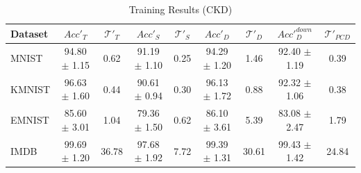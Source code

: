 \begin{table}
\caption{Training Results (CKD)}
\label{tab:train-table-ckd}
\begin{tabular}{lcccccccc}
\toprule
Dataset & $Acc'_T$ & $\mathcal{T}'_T$ & $Acc'_S$ & $\mathcal{T}'_S$ & $Acc'_D$ & $\mathcal{T}'_D$ & $Acc'^{down}_D$ & $\mathcal{T}'_{PCD}$ \\
\midrule
MNIST & 94.80 $\pm$ 1.15 & 0.62 & 91.19 $\pm$ 1.10 & 0.25 & 94.29 $\pm$ 1.20 & 1.46 & 92.40 $\pm$ 1.19 & 0.39 \\
KMNIST & 96.63 $\pm$ 1.60 & 0.44 & 90.61 $\pm$ 0.94 & 0.30 & 96.13 $\pm$ 1.72 & 0.88 & 92.32 $\pm$ 1.06 & 0.38 \\
EMNIST & 85.60 $\pm$ 3.01 & 1.04 & 79.36 $\pm$ 1.50 & 0.62 & 86.10 $\pm$ 3.61 & 5.39 & 83.08 $\pm$ 2.47 & 1.79 \\
IMDB & 99.69 $\pm$ 1.20 & 36.78 & 97.68 $\pm$ 1.92 & 7.72 & 99.39 $\pm$ 1.31 & 30.61 & 99.43 $\pm$ 1.42 & 24.84 \\
\bottomrule
\end{tabular}
\end{table}
